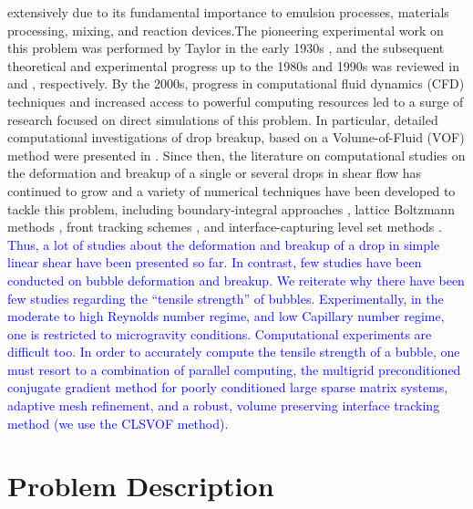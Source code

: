 \documentclass{elsarticle}
\begin{document}
{extensively due to its fundamental importance to emulsion processes, materials processing, mixing, and reaction devices.The pioneering 
experimental work on this problem was performed by Taylor in the early 1930s \cite{Tay32, Tay34}, and the subsequent theoretical and 
experimental progress up to the 1980s and 1990s was reviewed in \cite{Ral84} and \cite{Sto94}, respectively.  By the 2000s, progress in 
computational fluid dynamics (CFD) techniques and increased access to powerful computing resources led to a surge of research focused 
on direct simulations of this problem.  In particular, detailed computational investigations of drop breakup, based on a Volume-of-Fluid (VOF) 
method \cite{HirNic81} were presented in \cite{LiRenRen00, RenCri01-1, RenCri01-2, RenCriLi02,KhiRenCri03,Ren06,Ren07,Ren08-2}. 
Since then, the literature on computational studies on the deformation and breakup of a single or several drops in shear flow has continued 
to grow \cite{CriGuiAlfBlaLoe03, InaTomOgi03,ZhaMikBan06, BazAndMei06, JanAnd08, CroGriSch10,KomShaEskDer14,KomShaEskDer15, 
IoaLiuZha16, HerRan17,AmaBalCasOli19, ZhaShuGuaYan21} and a variety of numerical techniques have been developed to tackle this 
problem, including boundary-integral approaches \cite{CriBlaLoe01, JanAnd07}, lattice Boltzmann methods \cite{Ina06, KomShaEskDer14}, 
front tracking schemes \cite{UnvTry92}, and interface-capturing level set methods \cite{SusSmeOsh94}.
\textcolor{blue} 
{
Thus, a lot of studies about the deformation and breakup of a drop in simple linear shear have been presented so far. In contrast, few
 studies have been conducted on bubble deformation and breakup.  We reiterate why there have been few studies regarding the ``tensile strength'' of bubbles. Experimentally, in the moderate to high Reynolds number regime, and low Capillary number regime, one is restricted to microgravity conditions.  Computational experiments are difficult too. In order to accurately compute the tensile strength of a bubble, one must resort to a combination of 
parallel computing, the multigrid preconditioned conjugate gradient method\cite{tatebe1993multigrid,SusSmiHusOhtZhi07} for poorly conditioned large sparse matrix systems, adaptive mesh refinement\cite{AMReX_JOSS,SusSmiHusOhtZhi07}, and a robust, volume preserving interface tracking method (we use the CLSVOF method\cite{SusPuc00,SusSmiHusOhtZhi07}).
 }
}
\section{Problem Description}
\end{document}

